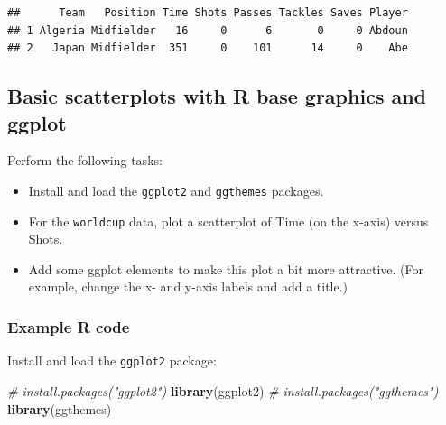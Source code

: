 \documentclass[]{book}
\makeatletter
\newenvironment{Shaded}{\begin{snugshade}}{\end{snugshade}}
\newcommand{\KeywordTok}[1]{\textcolor[rgb]{0.13,0.29,0.53}{\textbf{{#1}}}}
\newcommand{\DataTypeTok}[1]{\textcolor[rgb]{0.13,0.29,0.53}{{#1}}}
\newcommand{\DecValTok}[1]{\textcolor[rgb]{0.00,0.00,0.81}{{#1}}}
\newcommand{\StringTok}[1]{\textcolor[rgb]{0.31,0.60,0.02}{{#1}}}
\newcommand{\CommentTok}[1]{\textcolor[rgb]{0.56,0.35,0.01}{\textit{{#1}}}}
\newcommand{\NormalTok}[1]{{#1}}
\providecommand{\tightlist}{%
  \setlength{\itemsep}{0pt}\setlength{\parskip}{0pt}}
\newenvironment{kframe}{%
\medskip{}
\setlength{\fboxsep}{.8em}
 \def\at@end@of@kframe{}%
 \ifinner\ifhmode%
  \def\at@end@of@kframe{\end{minipage}}%
  \begin{minipage}{\columnwidth}%
 \fi\fi%
 \def\FrameCommand##1{\hskip\@totalleftmargin \hskip-\fboxsep
 \colorbox{shadecolor}{##1}\hskip-\fboxsep
     \hskip-\linewidth \hskip-\@totalleftmargin \hskip\columnwidth}%
 \MakeFramed {\advance\hsize-\width
   \@totalleftmargin\z@ \linewidth\hsize
   \@setminipage}}%
 {\par\unskip\endMakeFramed%
 \at@end@of@kframe}
\renewenvironment{Shaded}{\begin{kframe}}{\end{kframe}}
\makeatother
\begin{document}
\begin{Shaded}
\end{Shaded}

\begin{verbatim}
##      Team   Position Time Shots Passes Tackles Saves Player
## 1 Algeria Midfielder   16     0      6       0     0 Abdoun
## 2   Japan Midfielder  351     0    101      14     0    Abe
\end{verbatim}

\subsection{Basic scatterplots with R base graphics and
ggplot}\label{basic-scatterplots-with-r-base-graphics-and-ggplot}

Perform the following tasks:

\begin{itemize}
\tightlist
\item
  Install and load the \texttt{ggplot2} and \texttt{ggthemes} packages.
\item
  For the \texttt{worldcup} data, plot a scatterplot of Time (on the
  x-axis) versus Shots.
\item
  Add some ggplot elements to make this plot a bit more attractive. (For
  example, change the x- and y-axis labels and add a title.)
\end{itemize}

\subsubsection{Example R code}\label{example-r-code-5}

Install and load the \texttt{ggplot2} package:

\begin{Shaded}
\begin{Highlighting}[]
\CommentTok{# install.packages("ggplot2")}
\KeywordTok{library}\NormalTok{(ggplot2)}
\CommentTok{# install.packages("ggthemes")}
\KeywordTok{library}\NormalTok{(ggthemes)}
\end{Highlighting}
\end{Shaded}
\end{document}
